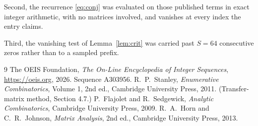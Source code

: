 \documentclass[11pt,a4paper]{article}
\theoremstyle{plain}
\theoremstyle{definition}
\begin{document}
Second, the recurrence \eqref{eq:conj} was evaluated on those published terms in exact
integer arithmetic, with no matrices involved, and vanishes at every index the entry claims.

Third, the vanishing test of Lemma~\ref{lem:crit} was carried past $S=64$ consecutive
zeros rather than to a sampled prefix.

\begin{thebibliography}{9}
 The OEIS Foundation, \emph{The On-Line Encyclopedia of Integer
Sequences}, \url{https://oeis.org}, 2026. Sequence A303956.
 R.~P.~Stanley, \emph{Enumerative Combinatorics}, Volume 1, 2nd ed.,
Cambridge University Press, 2011. (Transfer-matrix method, Section 4.7.)
 P.~Flajolet and R.~Sedgewick, \emph{Analytic Combinatorics}, Cambridge
University Press, 2009.
 R.~A.~Horn and C.~R.~Johnson, \emph{Matrix Analysis}, 2nd ed., Cambridge
University Press, 2013.
\end{thebibliography}
\end{document}
